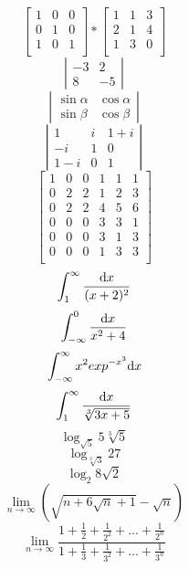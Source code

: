 \documentclass[a4paper]{article}
\begin{document}
\newline
$$
\left[ \begin{array}{ccc}
1 & 0 & 0 \\
0 & 1 & 0 \\
1 & 0 & 1 \\
\end{array} \right]
*
\left[ \begin{array}{ccc}
1 & 1 & 3 \\
2 & 1 & 4 \\
1 & 3 & 0 \\
\end{array} \right]
$$
\newline
$$
\left|
\begin{array}{rr}
-3 & 2\\
8 & -5
\end{array}
\right|
$$
\newline
$$
\left|
\begin{array}{cc}
\sin \alpha & \cos \alpha\\
\sin \beta & \cos \beta
\end{array}
\right|
$$
\newline
$$
\left|
\begin{array}{ccc}
1 & i & 1+i\\
-i & 1 & 0\\
1-i & 0 & 1
\end{array}
\right|
$$
\newline
$$ \left[
\begin{array}{c|cc|ccc}
1 & 0 & 0 & 1 & 1 & 1  \\
\hline
0 & 2 & 2 & 1 & 2 & 3\\
0 & 2 & 2 & 4 & 5 & 6 \\
\hline
0 & 0 & 0 & 3 & 3 & 1\\
0 & 0 & 0 & 3 & 1 & 3\\
0 & 0 & 0 & 1 & 3 & 3\\
\end{array} \right] 
$$
\newline
$$ 
\int_{1}^{\infty}\frac{{\rm d}x}{(x+2)^2}
$$
$$ 
\int_{-\infty}^{0}\frac{{\rm d}x}{x^2+4}
$$
$$ 
\int_{-\infty}^{\infty}x^2 exp^{-x^3}{\rm d}x 
$$
$$ 
\int_{1}^{\infty}\frac{{\rm d}x}{\sqrt[3]{3x+5}}
$$
\newline
$$ 
\log_{\sqrt{5}}5\sqrt[3]{5} 
$$
$$
\log_{\sqrt[3]{3}}27 
$$
$$ \log_{2}8\sqrt{2} $$
\newline
$$
\lim_{n\rightarrow\infty}
\left(
\sqrt{n+6\sqrt{n}+1}-\sqrt{n}
\right)
$$
$$
\lim_{n\rightarrow\infty} \frac{1+\frac{1}{2}+\frac{1}{2^{2}}+\ldots+\frac{1}{2^{n}}}{1+\frac{1}{3}+\frac{1}{3^{2}}+\ldots+\frac{1}{3^{n}}}
$$
\end{document}

